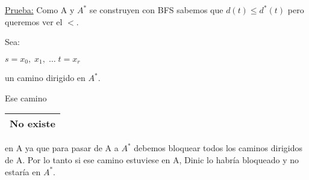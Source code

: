 \documentclass[12pt,a4paper]{report}
\begin{document}
		\underline{Prueba:} Como A y $A^{*}$ se construyen con BFS sabemos que $d(t) \leq d^{*}(t)$ pero queremos ver el $<$.
		
		Sea:
		\begin{center}
			$s = x_{0}, \; x_{1}, \; \dotsc \; t = x_{r}$
		\end{center}
	
		un camino dirigido en $A^{*}$.
	
		Ese camino \begin{tabular}{|c|} \hline No existe \\ \hline \end{tabular} en A ya que para pasar de A a $A^{*}$ debemos bloquear todos los caminos dirigidos de A. Por lo tanto si ese camino estuviese en A, Dinic lo habría bloqueado y no estaría en $A^{*}$.
		
\end{document}
